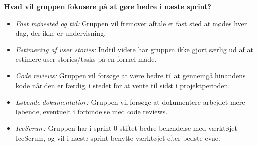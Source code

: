 \textbf{Hvad vil gruppen fokusere på at gøre bedre i næste sprint?}
\begin{itemize}
    \item \textit{Fast mødested og tid:} Gruppen vil fremover aftale et fast sted at mødes hver dag, der ikke er undervisning.
    \item \textit{Estimering af user stories:} Indtil videre har gruppen ikke gjort særlig ud af at estimere user stories/tasks på en formel måde.
    \item \textit{Code reviews:} Gruppen vil forsøge at være bedre til at gennemgå hinandens kode når den er færdig, i stedet for at vente til sidst
    i projektperioden.
    \item \textit{Løbende dokumentation:} Gruppen vil forsøge at dokumentere arbejdet mere løbende, eventuelt i forbindelse med code reviews.
    \item \textit{IceScrum:} Gruppen har i sprint 0 stiftet bedre bekendelse med værktøjet IceScrum, og vil i næste sprint benytte værktøjet efter bedste evne.
\end{itemize}